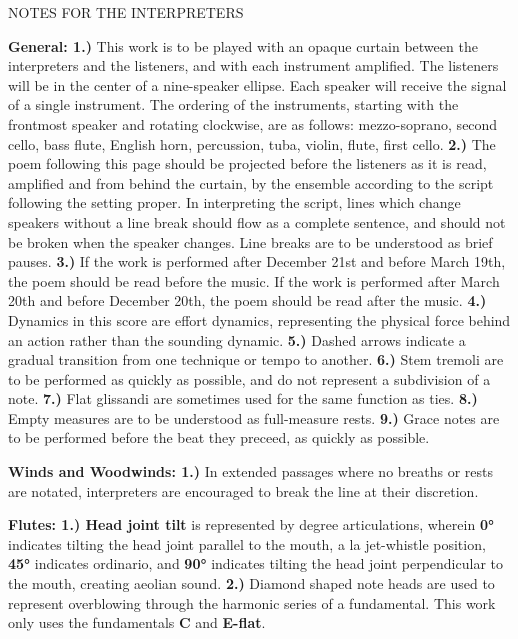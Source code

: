 \documentclass[11pt]{article}
\begin{document}
\vspace*{4\baselineskip}

\begingroup
\begin{center}
\huge NOTES FOR THE INTERPRETERS
\end{center}
\endgroup

\begingroup
\textbf{General: 1.)} This work is to be played with an opaque curtain between the interpreters and the listeners, and with each instrument amplified. The listeners will be in the center of a nine-speaker ellipse. Each speaker will receive the signal of a single instrument. The ordering of the instruments, starting with the frontmost speaker and rotating clockwise, are as follows: mezzo-soprano, second cello, bass flute, English horn, percussion, tuba, violin, flute, first cello. \textbf{2.)} The poem following this page should be projected before the listeners as it is read, amplified and from behind the curtain, by the ensemble according to the script following the setting proper. In interpreting the script, lines which change speakers without a line break should flow as a complete sentence, and should not be broken when the speaker changes. Line breaks are to be understood as brief pauses. \textbf{3.)} If the work is performed after December 21st and before March 19th, the poem should be read before the music. If the work is performed after March 20th and before December 20th, the poem should be read after the music. \textbf{4.)}  Dynamics in this score are effort dynamics, representing the physical force behind an action rather than the sounding dynamic. \textbf{5.)} Dashed arrows indicate a gradual transition from one technique or tempo to another. \textbf{6.)}  Stem tremoli are to be performed as quickly as possible, and do not represent a subdivision of a note. \textbf{7.)} Flat glissandi are sometimes used for the same function as ties. \textbf{8.)} Empty measures are to be understood as full-measure rests. \textbf{9.)} Grace notes are to be performed before the beat they preceed, as quickly as possible.
\endgroup

\begingroup
\textbf{Winds and Woodwinds: 1.)} In extended passages where no breaths or rests are notated, interpreters are encouraged to break the line at their discretion.
\endgroup

\begingroup
\textbf{Flutes: 1.) Head joint tilt} is represented by degree articulations, wherein \textbf{0°} indicates tilting the head joint parallel to the mouth, a la jet-whistle position, \textbf{45°} indicates ordinario, and \textbf{90°} indicates tilting the head joint perpendicular to the mouth, creating aeolian sound. \textbf{2.)} Diamond shaped note heads are used to represent overblowing through the harmonic series of a fundamental. This work only uses the fundamentals \textbf{C} and \textbf{E-flat}.
\endgroup
\end{document}
